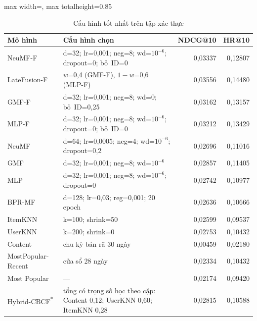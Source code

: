 \begin{table}[H]
    \centering\small
    \caption{Cấu hình tốt nhất trên tập xác thực}
    \label{tab:v2tuning}
    \begin{adjustbox}{max width=\textwidth, max totalheight=0.85\textheight}
    \begin{tabular}{|l|>{\raggedright\arraybackslash}p{6.8cm}|r|r|}
        \hline
        Mô hình & Cấu hình chọn & NDCG@10 & HR@10 \\ \hline
        NeuMF-F & d=32; lr=0{,}001; neg=8; wd=$10^{-6}$; dropout=0; bỏ~ID=0 & 0{,}03337 & 0{,}12807 \\ \hline
        LateFusion-F & $w$=0{,}4 (GMF-F), $1-w$=0{,}6 (MLP-F) & 0{,}03556 & 0{,}14480 \\ \hline
        GMF-F & d=32; lr=0{,}001; neg=8; wd=0; bỏ~ID=0{,}25 & 0{,}03162 & 0{,}13157 \\ \hline
        MLP-F & d=32; lr=0{,}001; neg=8; wd=$10^{-6}$; dropout=0; bỏ~ID=0 & 0{,}03212 & 0{,}13429 \\ \hline
        NeuMF & d=64; lr=0{,}0005; neg=4; wd=$10^{-6}$; dropout=0{,}2 & 0{,}02696 & 0{,}11016 \\ \hline
        GMF & d=32; lr=0{,}001; neg=8; wd=$10^{-6}$ & 0{,}02857 & 0{,}11405 \\ \hline
        MLP & d=32; lr=0{,}001; neg=8; wd=$10^{-6}$; dropout=0 & 0{,}02742 & 0{,}10977 \\ \hline
        BPR-MF & d=128; lr=0{,}03; reg=0{,}001; 20 epoch & 0{,}02636 & 0{,}10666 \\ \hline
        ItemKNN & k=100; shrink=50 & 0{,}02599 & 0{,}09537 \\ \hline
        UserKNN & k=200; shrink=0 & 0{,}02753 & 0{,}10432 \\ \hline
        Content & chu kỳ bán rã 30 ngày & 0{,}00459 & 0{,}02180 \\ \hline
        MostPopular-Recent & cửa sổ 28 ngày & 0{,}02334 & 0{,}10432 \\ \hline
        Most Popular & --- & 0{,}02174 & 0{,}09420 \\ \hline
        Hybrid-CBCF\textsuperscript{*} & tổng có trọng số học theo cặp: Content 0{,}12; UserKNN 0{,}60; ItemKNN 0{,}28 & 0{,}02815 & 0{,}10588 \\ \hline
    \end{tabular}
    \end{adjustbox}
\end{table}
